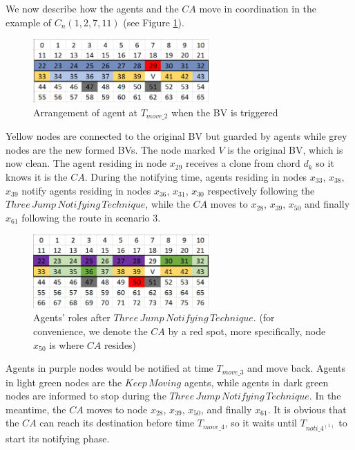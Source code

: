 We now describe how  the agents and the $CA$ move in coordination  in the example of   $C_n(1, 2, 7, 11)$  (see Figure \ref{fig:T29}). 
\begin{figure}[H]
  \centering  
  \includegraphics[width=0.6\textwidth]{figures/T29.png}
  \caption{Arrangement of agent at $T_{move\_2}$ when the BV is triggered}\label{fig:T29}
\end{figure}

Yellow nodes are connected to the original BV but guarded by agents while   grey nodes are the new formed BVs. The node marked $V$ is the original BV, which  is now clean. The agent residing in node $x_{29}$ receives a clone from chord $d_k$ so it knows it is the $CA$. During the notifying time, agents residing in nodes $x_{33}$, $x_{38}$, $x_{39}$ notify agents residing in nodes $x_{36}$, $x_{31}$, $x_{30}$ respectively following the $Three\,Jump\,Notifying\,Technique$,  while the $CA$ moves to $x_{28}$, $x_{39}$, $x_{50}$ and finally $x_{61}$ following the route in scenario 3.

\begin{figure}[H]
  \centering  
  \includegraphics[width=0.6\textwidth]{figures/T50.png}
  \caption{Agents' roles after $Three\,Jump\,Notifying\,Technique$. (for convenience, we denote the $CA$ by a red spot, more specifically, node $x_{50}$ is where $CA$ resides)}\label{fig:T50}
\end{figure}

Agents in purple nodes would be notified at  time $T_{move\_3}$ and move back. Agents in light green nodes are the $Keep\,Moving$ agents,  while agents in dark green nodes are informed to stop during the  $Three\,Jump\,Notifying\,Technique$. In the meantime, the $CA$ moves to node $x_{28}$, $x_{39}$, $x_{50}$, and finally $x_{61}$. It is obvious that the $CA$ can reach its destination before time $T_{move\_4}$, so it waits until $T_{noti\_{4^{(1)}}}$ to start its notifying phase. 

